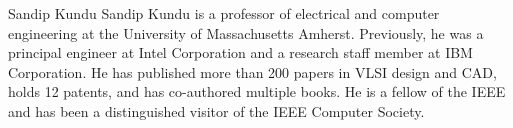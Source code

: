 \documentclass[10pt,journal,compsoc]{IEEEtran}
\begin{document}
\begin{IEEEbiography}{Sandip Kundu}
Sandip Kundu is a professor of electrical and computer engineering at the University of Massachusetts Amherst. Previously, he was a principal engineer at Intel Corporation and a research staff member at IBM Corporation. He has published more than 200 papers in VLSI design and CAD, holds 12 patents, and has co-authored multiple books. 
He is a fellow of the IEEE and has been a distinguished visitor of the IEEE Computer Society.
\end{IEEEbiography}
\end{document}
